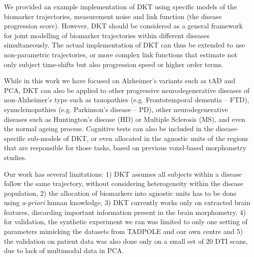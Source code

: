 \documentclass{llncs}
\begin{document}
We provided an example implementation of DKT using specific models of the biomarker trajectories, measurement noise and link function (the disease progression score). However, DKT should be considered as a general framework for joint modelling of biomarker trajectories within different diseases simultaneously. The actual implementation of DKT can thus be extended to use non-parametric trajectories, or more complex link functions that estimate not only subject time-shifts but also progression speed or higher order terms.

While in this work we have focused on Alzheimer's variants such as tAD and PCA, DKT can also be applied to other progressive neurodegenerative diseases of non-Alzheimer's type such as tauopathies (e.g. Frontotemporal dementia -- FTD), synucleinopathies (e.g. Parkinson's disease -- PD), other neurodegenerative diseases such as Huntington's disease (HD) or Multiple Sclerosis (MS), and even the normal ageing process. Cognitive tests can also be included in the disease-specific sub-models of DKT, or even allocated in the agnostic units of the regions that are responsible for those tasks, based on previous voxel-based morphometry studies. 


Our work has several limitations: 1) DKT assumes all subjects within a disease follow the same trajectory, without considering heterogeneity within the disease population, 2) the allocation of biomarkers into agnostic units has to be done using \emph{a-priori} human knowledge, 3) DKT currently works only on extracted brain features, discarding important information present in the brain morphometry, 4) for validation, the synthetic experiment we ran was limited to only one setting of parameters mimicking the datasets from TADPOLE and our own centre and 5) the validation on patient data was also done only on a small set of 20 DTI scans, due to lack of multimodal data in PCA.
\end{document}
